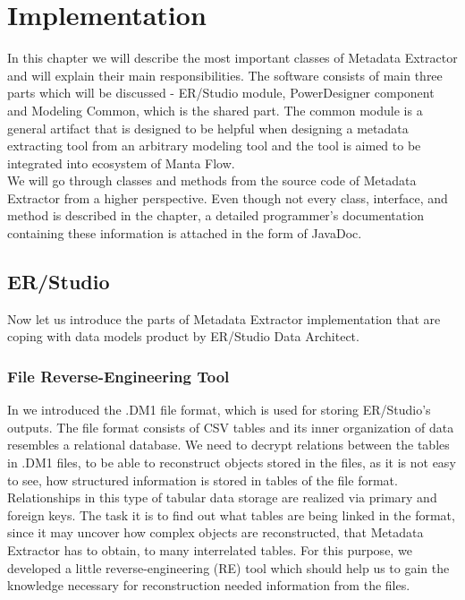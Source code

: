 \chapter{Implementation}
\label{implementation}

In this chapter we will describe the most important classes of Metadata Extractor and will explain their main responsibilities. The software consists of main three parts which will be discussed - ER/Studio module, PowerDesigner component and Modeling Common, which is the shared part. 
The common module is a general artifact that is designed to be helpful when designing a metadata extracting tool from an arbitrary modeling tool and the tool is aimed to be integrated into ecosystem of Manta Flow. \\

We will go through classes and methods from the source code of Metadata Extractor from a higher perspective. 
Even though not every class, interface, and method is described in the chapter, a detailed programmer's documentation containing these information is attached in the form of JavaDoc.

\section{ER/Studio}

Now let us introduce the parts of Metadata Extractor implementation that are coping with data models product by ER/Studio Data Architect.

\subsection{File Reverse-Engineering Tool}
\label{subsec:dm1_tool}

In  we introduced the .DM1 file format, which is used for storing ER/Studio's outputs.
The file format consists of CSV tables and its inner organization of data resembles a relational database.
We need to decrypt relations between the tables in .DM1 files, to be able to reconstruct objects stored in the files, as it is not easy to see, how structured information is stored in tables of the file format.
Relationships in this type of tabular data storage are realized via primary and foreign keys.
The task it is to find out what tables are being linked in the format, since it may uncover how complex objects are reconstructed, that Metadata Extractor has to obtain, to many interrelated tables.
For this purpose, we developed a little reverse-engineering (RE) tool which should help us to gain the knowledge necessary for reconstruction needed information from the files. \\

